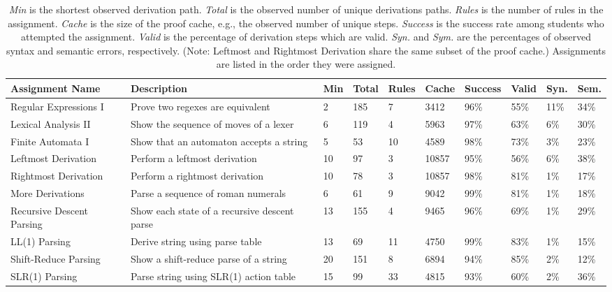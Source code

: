 \documentclass{sigchi}
\newcommand\tabhead[1]{\small\textbf{#1}}
\begin{document}
\begin{table}[!ht]\footnotesize
  \renewcommand{\arraystretch}{1.5}
  \begin{tabular}{|p{3.4cm}|p{4.4cm}|p{.7cm}|p{.7cm}|p{.7cm}|p{.7cm}|p{.8cm}|p{.7cm}||p{.7cm}|p{.7cm}|}
    \hline
    \tabhead{Assignment Name} & \tabhead{Description} & \tabhead{Min} & \tabhead{Total} & \tabhead{Rules} & \tabhead{Cache} & \tabhead{Success} & \tabhead{Valid} & \tabhead{Syn.} & \tabhead{Sem.} \\
    \hline
    Regular Expressions I & \scriptsize{Prove two regexes are equivalent} & 2 & 185 & 7 & 3412 & 96\% & 55\% & 11\% & 34\% \\
    \hline
    Lexical Analysis II & \scriptsize{Show the sequence of moves of a lexer} & 6 & 119 & 4 & 5963 & 97\% & 63\% & 6\% & 30\% \\
    \hline
    Finite Automata I & \scriptsize{Show that an automaton accepts a string} & 5 & 53 & 10 & 4589 & 98\% & 73\% & 3\% & 23\% \\
    \hline
    Leftmost Derivation & \scriptsize{Perform a leftmost derivation} & 10 & 97 & 3 & 10857 & 95\% & 56\% & 6\% & 38\% \\
    \hline
    Rightmost Derivation & \scriptsize{Perform a rightmost derivation} & 10 & 78 & 3 & 10857 & 98\% & 81\%  & 1\% & 17\% \\
    \hline
    More Derivations & \scriptsize{Parse a sequence of roman numerals} & 6 & 61 & 9 & 9042 & 99\% & 81\% & 1\% & 18\% \\
    \hline
    Recursive Descent Parsing & \scriptsize{Show each state of a recursive descent parse } & 13 & 155 & 4 & 9465 & 96\% & 69\% & 1\% & 29\% \\
    \hline
    LL(1) Parsing & \scriptsize{Derive string using parse table} & 13 & 69 & 11 & 4750 & 99\% & 83\% & 1\% & 15\% \\
    \hline
    Shift-Reduce Parsing & \scriptsize{Show a shift-reduce parse of a string} & 20 & 151 & 8 & 6894 & 94\% & 85\% & 2\% & 12\% \\
    \hline
    SLR(1) Parsing & \scriptsize{Parse string using SLR(1) action table} & 15 & 99 & 33 & 4815 & 93\% & 60\% & 2\% & 36\% \\
    \hline
  \end{tabular}
  \caption{\textit{Min} is the shortest observed derivation path. \textit{Total} is the observed number of unique derivations paths. \textit{Rules} is the number of rules in the assignment. \textit{Cache} is the size of the proof cache, e.g., the observed number of unique steps. \textit{Success} is the success rate among students who attempted the assignment. \textit{Valid} is the percentage of derivation steps which are valid. \textit{Syn.} and \textit{Sym.} are the percentages of observed syntax and semantic errors, respectively. (Note: Leftmost and Rightmost Derivation share the same subset of the proof cache.) Assignments are listed in the order they were assigned.}
  \label{tab:table1}
\end{table}
\end{document}
